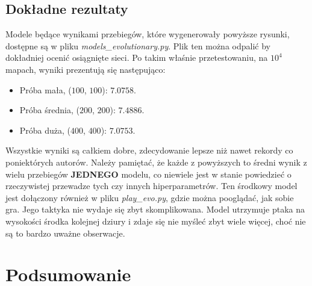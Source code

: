 \documentclass[12pt, A4]{article}
\begin{document}
\subsection{Dokładne rezultaty}
Modele będące wynikami przebiegów, które wygenerowały powyższe rysunki, dostępne są w pliku \textit{models\_evolutionary.py}. Plik ten można odpalić by dokładniej ocenić osiągnięte sieci. Po takim właśnie przetestowaniu, na $10^4$ mapach, wyniki prezentują się następująco:
\begin{itemize}
	\item Próba mała, ($100$, $100$): $7.0758$.
	\item Próba średnia, ($200$, $200$): $7.4886$.
	\item Próba duża, ($400$, $400$): $7.0753$.
\end{itemize}
Wszystkie wyniki są całkiem dobre, zdecydowanie lepsze niż nawet rekordy co poniektórych autorów. Należy pamiętać, że każde z powyższych to średni wynik z wielu przebiegów \textbf{JEDNEGO} modelu, co niewiele jest w stanie powiedzieć o rzeczywistej przewadze tych czy innych hiperparametrów.
\newline\newline
Ten środkowy model jest dołączony również w pliku \textit{play\_evo.py}, gdzie można pooglądać, jak sobie gra.
\newline
Jego taktyka nie wydaje się zbyt skomplikowana. Model utrzymuje ptaka na wysokości środka kolejnej dziury i zdaje się nie myśleć zbyt wiele więcej, choć nie są to bardzo uważne obserwacje.


\section{Podsumowanie}
\end{document}

